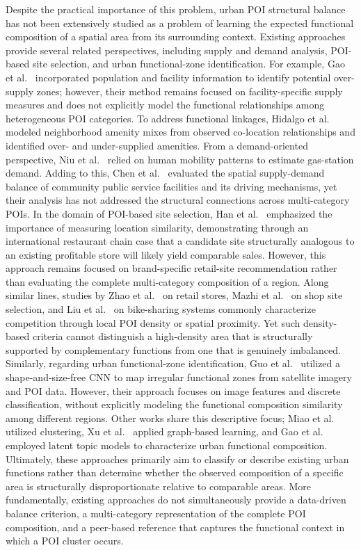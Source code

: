 \documentclass[sigconf]{acmart}
\begin{document}
Despite the practical importance of this problem, urban POI structural balance has not been extensively studied as a problem of learning the expected functional composition of a spatial area from its surrounding context. Existing approaches provide several related perspectives, including supply and demand analysis, POI-based site selection, and urban functional-zone identification. For example, Gao et al.~\cite{Gao03072019} incorporated population and facility information to identify potential over-supply zones; however, their method remains focused on facility-specific supply measures and does not explicitly model the functional relationships among heterogeneous POI categories. To address functional linkages, Hidalgo et al.~\cite{hidalgo2020amenity} modeled neighborhood amenity mixes from observed co-location relationships and identified over- and under-supplied amenities. From a demand-oriented perspective, Niu et al.~\cite{niu2016exploiting} relied on human mobility patterns to estimate gas-station demand. Adding to this, Chen et al.~\cite{chen2025research} evaluated the spatial supply-demand balance of community public service facilities and its driving mechanisms, yet their analysis has not addressed the structural connections across multi-category POIs. In the domain of POI-based site selection, Han et al.~\cite{HAN2022416} emphasized the importance of measuring location similarity, demonstrating through an international restaurant chain case that a candidate site structurally analogous to an existing profitable store will likely yield comparable sales. However, this approach remains focused on brand-specific retail-site recommendation rather than evaluating the complete multi-category composition of a region. Along similar lines, studies by Zhao et al.~\cite{zhao2025site} on retail stores, Mazhi et al.~\cite{inproceedings} on shop site selection, and Liu et al.~\cite{7373406} on bike-sharing systems commonly characterize competition through local POI density or spatial proximity. Yet such density-based criteria cannot distinguish a high-density area that is structurally supported by complementary functions from one that is genuinely imbalanced. Similarly, regarding urban functional-zone identification, Guo et al.~\cite{guo2023shape} utilized a shape-and-size-free CNN to map irregular functional zones from satellite imagery and POI data. However, their approach focuses on image features and discrete classification, without explicitly modeling the functional composition similarity among different regions. Other works share this descriptive focus; Miao et al.~\cite{miao2021analyzing} utilized clustering, Xu et al.~\cite{xu2023identification} applied graph-based learning, and Gao et al.~\cite{gao2017extracting} employed latent topic models to characterize urban functional composition. Ultimately, these approaches primarily aim to classify or describe existing urban functions rather than determine whether the observed composition of a specific area is structurally disproportionate relative to comparable areas. More fundamentally, existing approaches do not simultaneously provide a data-driven balance criterion, a multi-category representation of the complete POI composition, and a peer-based reference that captures the functional context in which a POI cluster occurs.
\end{document}
